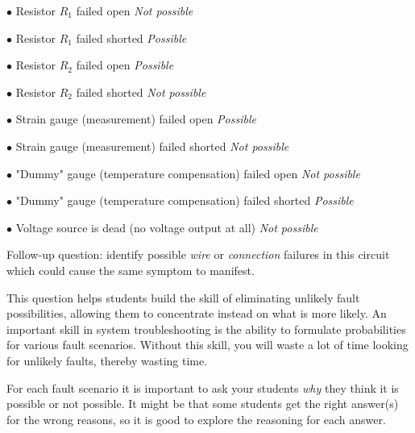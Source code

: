 \medskip
\item{$\bullet$} Resistor $R_1$ failed open {\it Not possible}
\item{$\bullet$} Resistor $R_1$ failed shorted {\it Possible}
\item{$\bullet$} Resistor $R_2$ failed open {\it Possible}
\item{$\bullet$} Resistor $R_2$ failed shorted {\it Not possible}
\item{$\bullet$} Strain gauge (measurement) failed open {\it Possible}
\item{$\bullet$} Strain gauge (measurement) failed shorted {\it Not possible}
\item{$\bullet$} "Dummy" gauge (temperature compensation) failed open {\it Not possible}
\item{$\bullet$} "Dummy" gauge (temperature compensation) failed shorted {\it Possible}
\item{$\bullet$} Voltage source is dead (no voltage output at all) {\it Not possible}
\medskip

\vskip 10pt

Follow-up question: identify possible {\it wire} or {\it connection} failures in this circuit which could cause the same symptom to manifest.







This question helps students build the skill of eliminating unlikely fault possibilities, allowing them to concentrate instead on what is more likely.  An important skill in system troubleshooting is the ability to formulate probabilities for various fault scenarios.  Without this skill, you will waste a lot of time looking for unlikely faults, thereby wasting time.

For each fault scenario it is important to ask your students {\it why} they think it is possible or not possible.  It might be that some students get the right answer(s) for the wrong reasons, so it is good to explore the reasoning for each answer.




